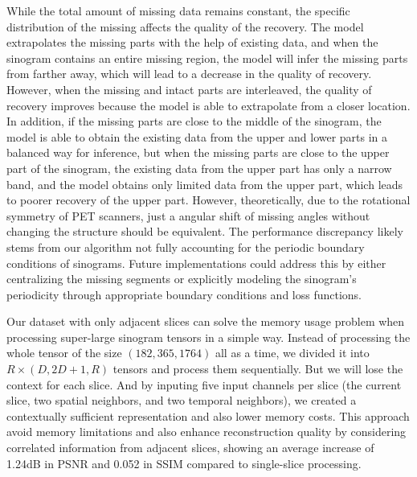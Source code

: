 \documentclass[12pt]{iopart}
\begin{document}
While the total amount of missing data remains constant, the specific distribution of the missing affects the quality of the recovery. The model extrapolates the missing parts with the help of existing data, and when the sinogram contains an entire missing region, the model will infer the missing parts from farther away, which will lead to a decrease in the quality of recovery. However, when the missing and intact parts are interleaved, the quality of recovery improves because the model is able to extrapolate from a closer location. In addition, if the missing parts are close to the middle of the sinogram, the model is able to obtain the existing data from the upper and lower parts in a balanced way for inference, but when the missing parts are close to the upper part of the sinogram, the existing data from the upper part has only a narrow band, and the model obtains only limited data from the upper part, which leads to poorer recovery of the upper part.
However, theoretically, due to the rotational symmetry of PET scanners, just a angular shift of missing angles without changing the structure should be equivalent. The performance discrepancy likely stems from our algorithm not fully accounting for the periodic boundary conditions of sinograms. Future implementations could address this by either centralizing the missing segments or explicitly modeling the sinogram's periodicity through appropriate boundary conditions and loss functions.

Our dataset with only adjacent slices can solve the memory usage problem when processing super-large sinogram tensors in a simple way. Instead of processing the whole tensor of the size $(182, 365, 1764)$ all as a time, we divided it into $R\times(D, 2D+1, R)$ tensors and process them sequentially. But we will lose the context for each slice. And by inputing five input channels per slice (the current slice, two spatial neighbors, and two temporal neighbors), we created a contextually sufficient representation and also lower memory costs. This approach  avoid memory limitations and also enhance reconstruction quality by considering correlated information from adjacent slices, showing an average increase of 1.24dB in PSNR and 0.052 in SSIM compared to single-slice processing.
\end{document}
